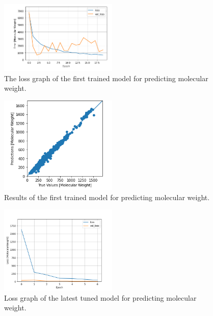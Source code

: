     \begin{figure}
        \centering
        \includegraphics[width=0.5\textwidth]{loss_gragh_20_epoch.PNG}
        \caption{The loss graph of the first trained model for predicting molecular weight.}
        \label{fig:model2-mol-weight-loss}
    \end{figure}
    \begin{figure}
        \centering
        \includegraphics[width=0.5\textwidth]{model_2_prediction.PNG}
        \caption{Results of the first trained model for predicting molecular weight.}
        \label{fig:model2-mol-weight-predictions}
    \end{figure}
    \begin{figure}
        \centering
        \includegraphics[width=0.5\textwidth]{model_23_7_epochs_loss_MolecularWeight.png}
        \caption{Loss graph of the latest tuned model for predicting molecular weight.}
        \label{fig:model23-mol-weight-loss}
    \end{figure}
